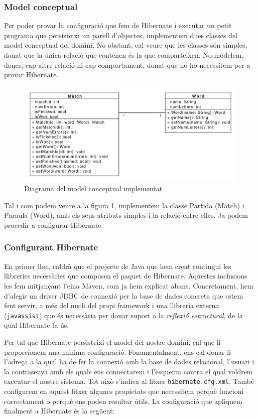 \subsubsection{Model conceptual}
Per poder provar la configuració que fem de Hibernate i executar un petit programa que persisteixi un parell d'objectes, implementem dues classes del model conceptual del domini. No obstant, cal veure que les classes són simples, donat que la única relació que contenen és la que comparteixen. No modelem, doncs, cap altre relació ni cap comportament, donat que no ho necessitem per a provar Hibernate.

\begin{figure}[h]
	\centering
	\includegraphics[width=0.8\linewidth]{figures/concept_model_impl.pdf}
	\caption{Diagrama del model conceptual implementat}
	\label{fig:conceptmodel}
\end{figure}

Tal i com podem veure a la figura \ref{fig:conceptmodel}, implementem la classe Partida (Match) i Paraula (Word), amb els seus atributs simples i la relació entre elles. Ja podem procedir a configurar Hibernate.

\subsubsection{Configurant Hibernate}
En primer lloc, caldrà que el projecte de Java que hem creat contingui les llibreries necessàries que composen el paquet de Hibernate. Aquestes inclusions les fem mitjançant l'eina Maven, com ja hem explicat abans. Concretament, hem d'afegir un driver JDBC de connexió per la base de dades concreta que estem fent servir, a més del nucli del propi framework i una llibreria externa (\texttt{javassist}) que és necessària per donar suport a la \emph{reflexió estructural}, de la qual Hibernate fa ús.

Per tal que Hibernate persisteixi el model del nostre domini, cal que li proporcionem una mínima configuració. Fonamentalment, ens cal donar-li l'adreça a la qual ha de fer la connexió amb la base de dades relacional, l'usuari i la contrasenya amb els quals ens connectarem i l'esquema contra el qual voldrem executar el nostre sistema. Tot això s'indica al fitxer \texttt{hibernate.cfg.xml}. També configurem en aquest fitxer algunes propietats que necessitem perquè funcioni correctament o perquè ens poden resultar útils. La configuració que apliquem finalment a Hibernate és la següent:

